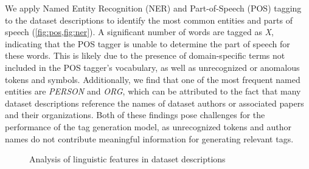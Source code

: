 We apply Named Entity Recognition (NER) and Part-of-Speech (POS) tagging to the dataset descriptions to identify the most common entities and parts of speech (\cref{fig:pos,fig:ner}). A significant number of words are tagged as \textit{X}, indicating that the POS tagger is unable to determine the part of speech for these words. This is likely due to the presence of domain-specific terms not included in the POS tagger's vocabulary, as well as unrecognized or anomalous tokens and symbols. Additionally, we find that one of the most frequent named entities are \textit{PERSON} and \textit{ORG}, which can be attributed to the fact that many dataset descriptions reference the names of dataset authors or associated papers and their organizations. Both of these findings pose challenges for the performance of the tag generation model, as unrecognized tokens and author names do not contribute meaningful information for generating relevant tags.



\begin{figure}[h]
    \centering
    \hfill
    \caption{Analysis of linguistic features in dataset descriptions}
    \label{fig:linguistic_features}
\end{figure}

